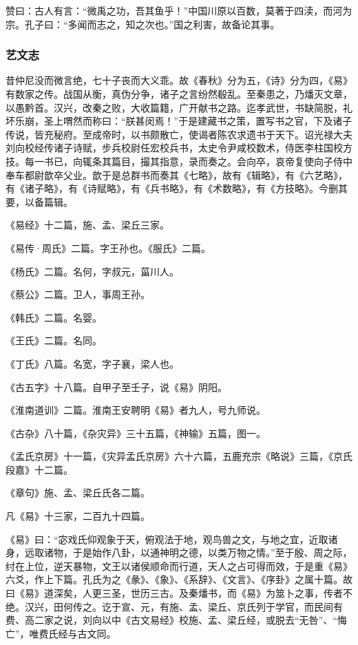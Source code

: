 \documentclass[]{article}
\begin{document}
赞曰：古人有言：``微禹之功，吾其鱼乎！''中国川原以百数，莫著于四渎，而河为宗。孔子曰：``多闻而志之，知之次也。''国之利害，故备论其事。

\hypertarget{header-n2751}{%
\subsubsection{艺文志}\label{header-n2751}}

昔仲尼没而微言绝，七十子丧而大义乖。故《春秋》分为五，《诗》分为四，《易》有数家之传。战国从衡，真伪分争，诸子之言纷然殽乱。至秦患之，乃燔灭文章，以愚黔首。汉兴，改秦之败，大收篇籍，广开献书之路。迄孝武世，书缺简脱，礼坏乐崩，圣上喟然而称曰：``朕甚闵焉！''于是建藏书之策，置写书之官，下及诸子传说，皆充秘府。至成帝时，以书颇散亡，使谒者陈农求遗书于天下。诏光禄大夫刘向校经传诸子诗赋，步兵校尉任宏校兵书，太史令尹咸校数术，侍医李柱国校方技。每一书已，向辄条其篇目，撮其指意，录而奏之。会向卒，哀帝复使向子侍中奉车都尉歆卒父业。歆于是总群书而奏其《七略》，故有《辑略》，有《六艺略》，有《诸子略》，有《诗赋略》，有《兵书略》，有《术数略》，有《方技略》。今删其要，以备篇辑。

《易经》十二篇，施、孟、梁丘三家。

《易传·周氏》二篇。字王孙也。《服氏》二篇。

《杨氏》二篇。名何，字叔元，菑川人。

《蔡公》二篇。卫人，事周王孙。

《韩氏》二篇。名婴。

《王氏》二篇。名同。

《丁氏》八篇。名宽，字子襄，梁人也。

《古五字》十八篇。自甲子至壬子，说《易》阴阳。

《淮南道训》二篇。淮南王安聘明《易》者九人，号九师说。

《古杂》八十篇，《杂灾异》三十五篇，《神输》五篇，图一。

《孟氏京房》十一篇，《灾异孟氏京房》六十六篇，五鹿充宗《略说》三篇，《京氏段嘉》十二篇。

《章句》施、孟、梁丘氏各二篇。

凡《易》十三家，二百九十四篇。

《易》曰：``宓戏氏仰观象于天，俯观法于地，观鸟兽之文，与地之宜，近取诸身，远取诸物，于是始作八卦，以通神明之德，以类万物之情。''至于殷、周之际，纣在上位，逆天暴物，文王以诸侯顺命而行道，天人之占可得而效，于是重《易》六爻，作上下篇。孔氏为之《彖》、《象》、《系辞》、《文言》、《序卦》之属十篇。故曰《易》道深矣，人更三圣，世历三古。及秦燔书，而《易》为筮卜之事，传者不绝。汉兴，田何传之。讫于宣、元，有施、孟、梁丘、京氏列于学官，而民间有费、高二家之说，刘向以中《古文易经》校施、孟、梁丘经，或脱去``无咎''、``悔亡''，唯费氏经与古文同。
\end{document}

